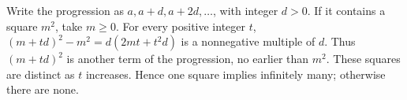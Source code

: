 Write the progression as $a,a+d,a+2d,\ldots$, with integer $d>0$. If it contains a square $m^2$, take $m\ge 0$. For every positive integer $t$, $(m+td)^2-m^2=d(2mt+t^2d)$ is a nonnegative multiple of $d$. Thus $(m+td)^2$ is another term of the progression, no earlier than $m^2$. These squares are distinct as $t$ increases. Hence one square implies infinitely many; otherwise there are none.
